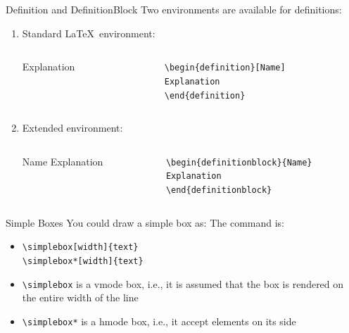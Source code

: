 \documentclass[english,sectioncirclenumberstyle]{ciadbeamer}
\begin{document}
\begin{frame}{Definition and DefinitionBlock}
	Two environments are available for definitions:
	\begin{enumerate}
	\item Standard \LaTeX\ environment:
		\begin{columns}
			\begin{column}{.5\linewidth}
				\begin{definition}[Name]
					Explanation
				\end{definition}
			\end{column}
			\begin{column}{.5\linewidth}
				\texttt{{\textbackslash}begin\{definition\}[Name]} \\
				\texttt{Explanation} \\
				\texttt{{\textbackslash}end\{definition\}}
			\end{column}
		\end{columns}
		\vspace{1cm}
	\item Extended environment:
		\begin{columns}
			\begin{column}{.5\linewidth}
				\begin{definitionblock}{Name}
					Explanation
				\end{definitionblock}
			\end{column}
			\begin{column}{.5\linewidth}
				\texttt{{\textbackslash}begin\{definitionblock\}\{Name\}} \\
				\texttt{Explanation} \\
				\texttt{{\textbackslash}end\{definitionblock\}}
			\end{column}
		\end{columns}
	\end{enumerate}
\end{frame}

\begin{frame}{Simple Boxes}
	You could draw a simple box as:
	The command is:	
	\begin{itemize}
	\item \texttt{{\textbackslash}simplebox[width]\{text\}} \\
		\texttt{{\textbackslash}simplebox*[width]\{text\}} \\[.5cm]
	\item \texttt{{\textbackslash}simplebox} is a vmode box, i.e., it is assumed that the box is rendered on the entire width of the line
	\item \texttt{{\textbackslash}simplebox*} is a hmode box, i.e., it accept elements on its side
	\end{itemize}
\end{frame}
\end{document}
